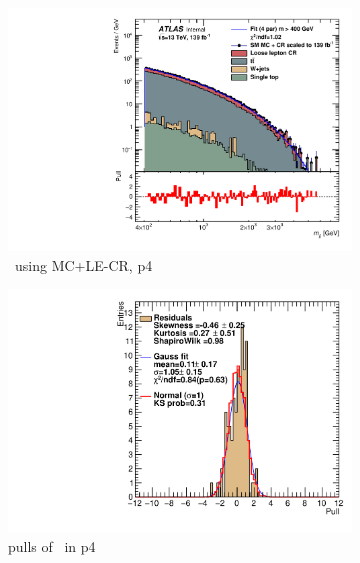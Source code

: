  \begin{figure}[ht]
    \centering
    \begin{subfigure}[h]{0.38\linewidth}
    \includegraphics[scale=0.3]{figs/ch6/fit/variable_nosmooth/p4/1PB/output_SMMCplusCR_Mjj_p4.pdf}%
    \caption{\mjj \ using MC+LE-CR, p4}
    \end{subfigure}
    \hfill
    \begin{subfigure}[h]{0.4\linewidth}
    \includegraphics[scale=0.32]{figs/ch6/fit/variable_nosmooth/p4/1PB/pull_SMMCplusCR_Mjj_p4.pdf}%
    \caption{pulls of \mjj \ in p4}
    \end{subfigure}
    \hfill
    \begin{subfigure}[h]{0.38\linewidth}

\end{subfigure}
\end{figure}
